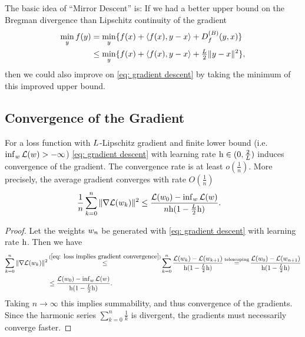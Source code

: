 \begin{remark}\label{rem: mirror descent}
	The basic idea of ``Mirror Descent''
	\parencite[e.g.][]{guptaAdvancedAlgorithmsFall2020,chenLargeScaleOptimizationData2019,bubeckConvexOptimizationAlgorithms2015}
	is: If we had a better upper bound on the Bregman divergence than Lipschitz
	continuity of the gradient 
	\begin{align*}
		\min_y f(y)
		&= \min_y \{f(x) + \langle f(x), y-x\rangle +D^{(B)}_{f}(y,x)\} \\
		&\le \min_y\{f(x) + \langle f(x), y-x\rangle +\tfrac{L}{2} \|y-x\|^2\},
	\end{align*}
	then we could also improve on \ref{eq: gradient descent} by taking the minimum of this
	improved upper bound.
\end{remark}

\subsection{Convergence of the Gradient}

\begin{theorem}
	\label{thm: convergence of the gradient (only lip cont)}
	For a loss function with \(L\)-Lipschitz gradient and finite lower bound
	(i.e. \(\inf_{w}\mathcal{L}(w) >-\infty\)) \ref{eq: gradient descent} with
	learning rate \(\text{h}\in(0,\tfrac2{L})\) induces convergence of the gradient.
	The convergence rate is at least \(o(\tfrac1n)\). More precisely, the average
	gradient converges with rate \(O(\tfrac1n)\)
	\begin{align*}
		\frac1{n}\sum_{k=0}^n \|\nabla\mathcal{L}(w_k)\|^2
		&\le \frac{\mathcal{L}(w_0) - \inf_{w}\mathcal{L}(w)}{n\text{h}(1-\tfrac{L}2\text{h})}.
	\end{align*} 
\end{theorem}
\begin{proof}
	Let the weights \(w_n\) be generated with \ref{eq: gradient descent} with learning rate \(\text{h}\).
	Then we have	
	\begin{align*}
		\sum_{k=0}^n \|\nabla\Loss(\weights_k)\|^2
		&\xle{(\ref{eq: loss implies gradient convergence})}
		\sum_{k=0}^n \frac{\Loss(\weights_k) - \Loss(\weights_{k+1})}{\lr(1-\tfrac{\ubound}2\lr)}
		\xeq{\text{telescoping}} \frac{\Loss(\weights_0) - \Loss(\weights_{n+1})}{\lr(1-\tfrac{\ubound}2\lr)}
		\\
		&\le \frac{\Loss(\weights_0)
		- \inf_{\weights}\Loss(\weights)}{\lr(1-\tfrac{\ubound}2\lr)}.
	\end{align*}
	Taking \(n\to\infty\) this implies summability, and thus convergence of the
	gradients. Since the harmonic series \(\sum_{k=0}^n \tfrac1{k}\) is divergent,
	the gradients must necessarily converge faster.
\end{proof}

